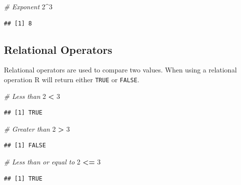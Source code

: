 \documentclass[
]{book}
\newenvironment{Shaded}{\begin{snugshade}}{\end{snugshade}}
\newcommand{\CommentTok}[1]{\textcolor[rgb]{0.56,0.35,0.01}{\textit{#1}}}
\newcommand{\DecValTok}[1]{\textcolor[rgb]{0.00,0.00,0.81}{#1}}
\newcommand{\OperatorTok}[1]{\textcolor[rgb]{0.81,0.36,0.00}{\textbf{#1}}}
\newcommand{\StringTok}[1]{\textcolor[rgb]{0.31,0.60,0.02}{#1}}
\begin{document}
\begin{Shaded}
\begin{Highlighting}[]
\CommentTok{# Exponent}
\DecValTok{2}\OperatorTok{^}\DecValTok{3}
\end{Highlighting}
\end{Shaded}

\begin{verbatim}
## [1] 8
\end{verbatim}

\hypertarget{relational-operators}{%
\subsection*{Relational Operators}\label{relational-operators}}

Relational operators are used to compare two values. When using a relational operation R will return either \texttt{TRUE} or \texttt{FALSE}.

\begin{Shaded}
\begin{Highlighting}[]
\CommentTok{# Less than}
\DecValTok{2} \OperatorTok{<}\StringTok{ }\DecValTok{3}
\end{Highlighting}
\end{Shaded}

\begin{verbatim}
## [1] TRUE
\end{verbatim}

\begin{Shaded}
\begin{Highlighting}[]
\CommentTok{# Greater than}
\DecValTok{2} \OperatorTok{>}\StringTok{ }\DecValTok{3}
\end{Highlighting}
\end{Shaded}

\begin{verbatim}
## [1] FALSE
\end{verbatim}

\begin{Shaded}
\begin{Highlighting}[]
\CommentTok{# Less than or equal to}
\DecValTok{2} \OperatorTok{<=}\StringTok{ }\DecValTok{3}
\end{Highlighting}
\end{Shaded}

\begin{verbatim}
## [1] TRUE
\end{verbatim}
\end{document}

